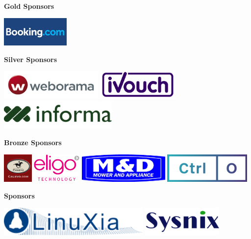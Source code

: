 \begin{center}
\vfill

\textbf{\Large \textsf{Gold Sponsors}}

\vfill

\includegraphics[height=1.5cm]{img/booking-logo.jpg}
\vfill

\textbf{\Large \textsf{Silver Sponsors}}

\vfill

\includegraphics[height=1.5cm]{img/logo-weborama1.png}
\includegraphics[height=1.5cm]{img/ivouch-logo.png}
\includegraphics[height=1.5cm]{img/informa-logo.png}
\vfill

\textbf{\Large \textsf{Bronze Sponsors}}

\vfill

\includegraphics[height=1.5cm]{img/calevo-logo.jpg}
\includegraphics[height=1.5cm]{img/eligo-logo.jpg}
\includegraphics[height=1.5cm]{img/mandd-logo.png}
\includegraphics[height=1.5cm]{img/CtrlO-logo.png}
\vfill

\textbf{\Large \textsf{Sponsors}}

\vfill

\includegraphics[height=1.5cm]{img/linuxia-logo.png}
\includegraphics[height=1.5cm]{img/sysnix-logo-small.png}
\vfill
\end{center}